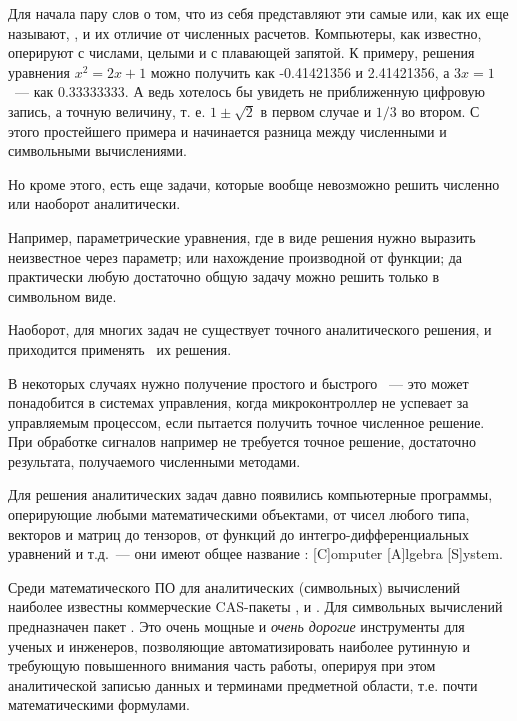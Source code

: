 Для начала пару слов о том, что из себя представляют эти самые
 или, как их еще называют,
, и их отличие от
численных расчетов. Компьютеры, как известно, оперируют с числами, целыми и с
плавающей запятой. К примеру,
решения уравнения $x^{2} = 2x + 1$ можно получить как -0.41421356 и 2.41421356,
а $3x = 1$\ --- как 0.33333333. А ведь хотелось бы увидеть не приближенную
цифровую запись, а точную величину, т. е. $1\pm\sqrt{2}$ в первом случае и $1/3$
во втором. С этого простейшего примера и начинается разница между численными и
символьными вычислениями.

Но кроме этого, есть еще задачи, которые вообще невозможно решить численно или
наоборот аналитически.

Например, параметрические уравнения, где в виде решения нужно выразить
неизвестное через параметр; или нахождение производной от функции; да
практически любую достаточно общую задачу можно решить только в символьном виде.

Наоборот, для многих задач не существует точного аналитического решения, и
приходится применять \ их решения.

В некоторых случаях нужно получение простого и быстрого \ --- это может понадобится в системах управления,
когда микроконтроллер не успевает за управляемым процессом, если пытается
получить точное численное решение. При обработке сигналов например не требуется
точное решение, достаточно результата, получаемого численными методами.

Для решения аналитических задач давно появились компьютерные программы,
оперирующие любыми математическими объектами, от чисел любого типа, векторов и
матриц до тензоров, от функций до интегро-дифференциальных уравнений и т.д.\
--- они имеют общее название : [C]omputer [A]lgebra [S]ystem.

Среди математического ПО для аналитических (символьных) вычислений наиболее
известны коммерческие CAS-пакеты \prog{Maple}, \prog{Mathematica} и
\prog{MathCAD}. Для символьных вычислений предназначен пакет .
Это очень мощные и \emph{очень дорогие} инструменты для ученых и инженеров,
позволяющие автоматизировать наиболее рутинную и требующую повышенного внимания
часть работы, оперируя при этом аналитической записью данных и терминами
предметной области, т.е. почти математическими формулами.

